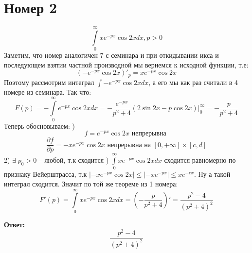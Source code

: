 \documentclass[a4paper,12pt]{article}
\begin{document}
\section*{Номер 2}
\[
\int\limits_0^{\infty} x e^{-px} \cos 2x dx , p > 0
\]
Заметим, что номер аналогичен 7 с семинара и при откидывании икса и последующем взятии частной производной мы вернемся к исходной функции, т.е:
\[
(- e^{-px} \cos 2x)'_p = x e^{-px} \cos 2x 
\]
Поэтому рассмотрим интеграл $\int - e^{-px} \cos 2x dx $, а его мы как раз считали в 4 номере из семинара. Так что:
\[
F(p) = -\int\limits_0^{\infty} e^{-px} \cos 2x dx =- \frac{e^{-px}}{p^2 + 4} ( 2 \sin 2x -p \cos 2x) \Bigg|_0^{\infty} = -\frac{p}{p^2 + 4} 
\]
Теперь обосновываем:
) 
\[
f = e^{-px} \cos 2x \text{ непрерывна }
\]
\[
\frac{\partial f}{\partial p} = -x e^{-px} \cos 2x \text{ непрерывна на } [0, + \infty] \times [c, d]
\]
2) $\exists \; p_0 > 0 $ -- любой, т.к  сходится
) $\int\limits_0^{\infty} xe^{-px} \cos 2x dx $ сходится равномерно по признаку Вейерштрасса, т.к $\left| -x e^{-px} \cos 2x \right| \leq \left|-x e^{-px} \right| \leq xe^{-cx}$.
Ну а такой интеграл сходится. Значит по той же теореме из 1 номера:
\[
F'(p) = \int\limits_0^{\infty} xe^{-px} \cos 2x dx  = \left( -\frac{p}{p^2 + 4}\right)' = \frac{p^2 - 4}{(p^2 + 4)^2}
\]
\begin{center}
\textbf{Ответ: } 
\[
\frac{p^2 - 4}{(p^2 + 4)^2}
\]
\end{center}







\clearpage
\end{document}

